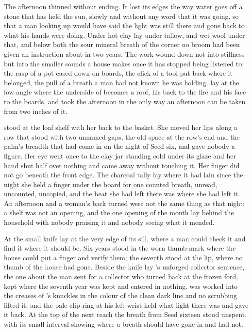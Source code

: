 The afternoon thinned without ending. It lost its edges the way water goes off a stone that has held the sun, slowly and without any word that it was going, so that a man looking up would have said the light was still there and gone back to what his hands were doing. Under  hot clay lay under tallow, and wet wool under that, and below both the sour mineral breath of the corner no broom had been given an instruction about in two years. The work wound down not into stillness but into the smaller sounds a house makes once it has stopped being listened to: the rasp of a pot eased down on boards, the click of a tool put back where it belonged, the pull of a breath a man had not known he was holding.  lay at the low angle where the underside of  becomes a roof, his back to the fire and his face to the boards, and took the afternoon in the only way an afternoon can be taken from two inches of it.

 stood at the loaf shelf with her back to the basket. She moved her lips along a row that stood with two unnamed gaps, the old space at the row's end and the palm's breadth that had come in on the night of Seed six, and gave nobody a figure. Her eye went once to the clay jar standing cold under its glaze and her hand shut half over nothing and came away without touching it. Her finger did not go beneath the front edge. The charcoal tally lay where it had lain since the night she held a finger under the board for one counted breath, unread, uncounted, uncopied, and the beat she had left there was where she had left it. An afternoon and a woman's back turned were not the same thing as that night; a shelf was not an opening, and the one opening of the month lay behind the household with nobody praising it and nobody seeing what it mended.

\scenebreak

At  the small knife lay at the very edge of its sill, where a man could check it and find it where it should be. Six years stood in the worn thumb-mark where the house could put a finger and verify them; the seventh stood at the lip, where no thumb of the house had gone. Beside the knife lay 's unforged collector sentence, the one about the man sent for a collector who turned back at the frozen ford, kept where the seventh year was kept and entered in nothing.  was worked into the creases of 's knuckles in the colour of the clean dark line and no scrubbing lifted it, and the pale clip-ring at his left wrist held what light there was and gave it back. At the top of the next reach the breath from Seed sixteen stood unspent, with its small interval showing where a breath should have gone in and had not.

